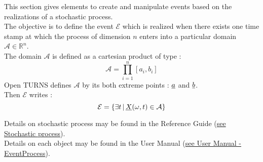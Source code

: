 \renewcommand{\filename}{docUC_EventProcess.tex}
\renewcommand{\filetitle}{UC : Creation and manipulation of a process event}

\HeaderIIILevel

\label{EventProcess}



This section gives elements to create and manipulate events based on the realizations of a stochastic process.\\




The objective is to define the event $\mathcal{E}$ which is realized when there exists one time stamp at which the process of dimension $n$ enters into a particular domain $\mathcal{A} \in \mathbb{R}^n$.\\
The domain $\mathcal{A}$ is defined as a cartesian product of type :
$$
\mathcal{A} = \prod_{i=1}^n [a_i,b_i]
$$
Open TURNS defines $\mathcal{A}$ by its both extreme points : ${\underline{a}}$ and ${\underline{b}}$.\\
Then $\mathcal{E}$  writes : 
\begin{equation}\label{eventProcStoch}
  \mathcal{E} = \{ \exists t \, | \, {\underline{X}}(\omega,t)  \in \mathcal{A} \}
\end{equation}

Details on stochastic process may be found in the Reference Guide (\href{OpenTURNS_ReferenceGuide.pdf}{see Stochastic process}).\\
Details on each object may be found in the User Manual  (\href{OpenTURNS_UserManual_TUI.pdf}{see User Manual - EventProcess}).\\

